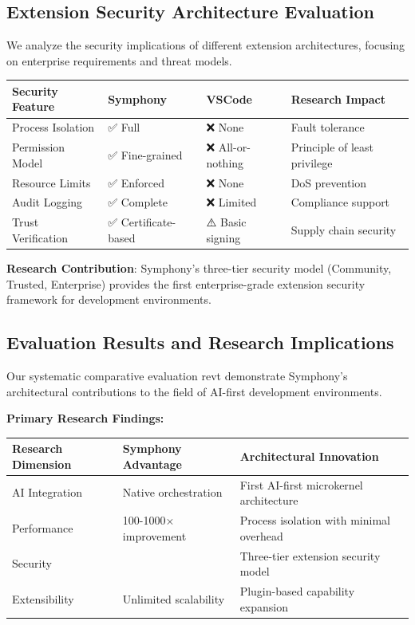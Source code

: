\subsection{Extension Security Architecture Evaluation}
\label{subsec:security-evaluation}

We analyze the security implications of different extension architectures, focusing on enterprise requirements and threat models.

\begin{center}
\begin{tabular}{@{}p{3cm}p{3cm}p{3cm}p{3cm}@{}}
\toprule
\textbf{Security Feature} & \textbf{Symphony} & \textbf{VSCode} & \textbf{Research Impact} \\
\midrule
Process Isolation & ✅ Full & ❌ None & Fault tolerance \\
Permission Model & ✅ Fine-grained & ❌ All-or-nothing & Principle of least privilege \\
Resource Limits & ✅ Enforced & ❌ None & DoS prevention \\
Audit Logging & ✅ Complete & ❌ Limited & Compliance support \\
Trust Verification & ✅ Certificate-based & ⚠️ Basic signing & Supply chain security \\
\bottomrule
\end{tabular}
\label{tab:security-comparison}
\end{center}

\textbf{Research Contribution}: Symphony's three-tier security model (Community, Trusted, Enterprise) provides the first enterprise-grade extension security framework for development environments.

\subsection{Evaluation Results and Research Implications}
\label{subsec:evaluation-implications}

Our systematic comparative evaluation revt demonstrate Symphony's architectural contributions to the field of AI-first development environments.

\textbf{Primary Research Findings:}

\begin{center}
\begin{tabular}{@{}p{4cm}p{3cm}p{5cm}@{}}
\toprule
\textbf{Research Dimension} & \textbf{Symphony Advantage} & \textbf{Architectural Innovation} \\
\midrule
AI Integration & Native orchestration & First AI-first microkernel architecture \\
Performance & 100-1000× improvement & Process isolation with minimal overhead \\
Security & & Three-tier extension security model \\
Extensibility & Unlimited scalability & Plugin-based capability expansion \\
\bottomrule
\end{tabular}
\label{tab:feature-research-contributions}
\end{center}

